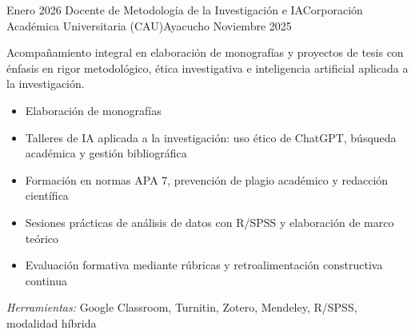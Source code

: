 \experience
{Enero 2026} {Docente de Metodología de la Investigación e IA}{Corporación Académica Universitaria (CAU)}{Ayacucho}
{Noviembre 2025} {
	Acompañamiento integral en elaboración de monografías y proyectos de tesis con énfasis en rigor metodológico, ética investigativa e inteligencia artificial aplicada a la investigación.
	\begin{itemize}
		\item Elaboración de monografías
		\item Talleres de IA aplicada a la investigación: uso ético de ChatGPT, búsqueda académica y gestión bibliográfica
		\item Formación en normas APA 7, prevención de plagio académico y redacción científica
		\item Sesiones prácticas de análisis de datos con R/SPSS y elaboración de marco teórico
		\item Evaluación formativa mediante rúbricas y retroalimentación constructiva continua
	\end{itemize}
}
{\footnotesize{\emph{Herramientas:} Google Classroom, Turnitin, Zotero, Mendeley, R/SPSS, modalidad híbrida}}
